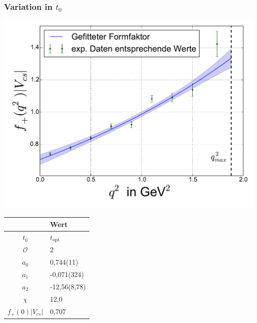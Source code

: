\documentclass[hyperref={pdfpagelabels=false}]{beamer}
\begin{document}
\begin{frame}
 \frametitle{Variation in $t_0$}
 \begin{minipage}[h]{0.66\textwidth}
  \includegraphics[width=1.0\textwidth]{../Fit/D+-2O-topt.pdf}
 \end{minipage}
 \begin{minipage}[h]{0.32\textwidth}
  \begin{table}[h]
   \begin{tabular}{c|l}
   \toprule
     & Wert\\
    \midrule
    $t_0$ & $t_\text{opt}$\\
    $\mathcal{O}$ & 2\\
    \midrule
    $a_0$ & 0,744(11)\\
    $a_1$ & -0,071(324)\\
    $a_2$ & -12,56(8,78)\\
    \midrule
    $\chi$ & 12,0\\
    $f_+(0)|V_{cs}|$ & 0,707\\
    \bottomrule\bottomrule
   \end{tabular}

  \end{table}

 \end{minipage}
\end{frame}
\end{document}
